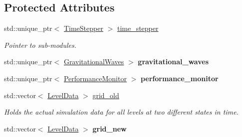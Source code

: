 \subsection*{Protected Attributes}
\begin{DoxyCompactItemize}
\item 
\mbox{\label{classsledgehamr_1_1Sledgehamr_aa2e845b6090d41759cc34caa18fe1739}} 
std\+::unique\+\_\+ptr$<$ \mbox{\hyperlink{classsledgehamr_1_1TimeStepper}{Time\+Stepper}} $>$ \mbox{\hyperlink{classsledgehamr_1_1Sledgehamr_aa2e845b6090d41759cc34caa18fe1739}{time\+\_\+stepper}}
\begin{DoxyCompactList}\small\item\em Pointer to sub-\/modules. \end{DoxyCompactList}\item 
\mbox{\label{classsledgehamr_1_1Sledgehamr_a9aaf5367722a908a86e99393f6fc5aa5}} 
std\+::unique\+\_\+ptr$<$ \mbox{\hyperlink{classsledgehamr_1_1GravitationalWaves}{Gravitational\+Waves}} $>$ {\bfseries gravitational\+\_\+waves}
\item 
\mbox{\label{classsledgehamr_1_1Sledgehamr_a6b6f544d51bc9f4b8e8ca4f4ed58d368}} 
std\+::unique\+\_\+ptr$<$ \mbox{\hyperlink{classsledgehamr_1_1PerformanceMonitor}{Performance\+Monitor}} $>$ {\bfseries performance\+\_\+monitor}
\item 
\mbox{\label{classsledgehamr_1_1Sledgehamr_ab90902175e4d8af5dc39112b136642be}} 
std\+::vector$<$ \mbox{\hyperlink{classsledgehamr_1_1LevelData}{Level\+Data}} $>$ \mbox{\hyperlink{classsledgehamr_1_1Sledgehamr_ab90902175e4d8af5dc39112b136642be}{grid\+\_\+old}}
\begin{DoxyCompactList}\small\item\em Holds the actual simulation data for all levels at two different states in time. \end{DoxyCompactList}\item 
\mbox{\label{classsledgehamr_1_1Sledgehamr_a677eb6121cd9161e9c1ba976d89b694f}} 
std\+::vector$<$ \mbox{\hyperlink{classsledgehamr_1_1LevelData}{Level\+Data}} $>$ {\bfseries grid\+\_\+new}
\item 
\mbox{\label{classsledgehamr_1_1Sledgehamr_a0f4b66c05d9b5b7f5f4acb5fc5dfd84b}} 

\end{DoxyCompactItemize}
